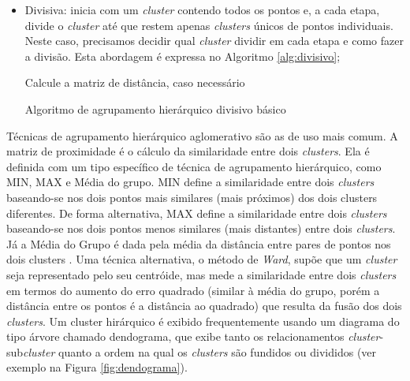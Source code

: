 \begin{itemize}
\begin{itemize}
        \item Divisiva: inicia com um \textit{cluster} contendo todos os pontos e, a cada etapa, divide o \textit{cluster} até que restem apenas \textit{clusters} únicos de pontos individuais. Neste caso, precisamos decidir qual \textit{cluster} dividir em cada etapa e como fazer a divisão. Esta abordagem é expressa no Algoritmo \ref{alg:divisivo};
        
        \begin{algorithm}[!htb]
            \SetAlgoLined
            Calcule a matriz de distância, caso necessário\;
        \caption{Algoritmo de agrupamento hierárquico divisivo básico}
        \label{alg:divisivo}
        \end{algorithm}
        
    \end{itemize}
    
    Técnicas de agrupamento hierárquico aglomerativo são as de uso mais comum. A matriz de proximidade é o cálculo da similaridade entre dois \textit{clusters}. Ela é definida com um tipo específico de técnica de agrupamento hierárquico, como MIN, MAX e Média do grupo. MIN define a similaridade entre dois \textit{clusters} baseando-se nos dois pontos mais similares (mais próximos) dos dois clusters diferentes. De forma alternativa, MAX define a similaridade entre dois \textit{clusters} baseando-se nos dois pontos menos similares (mais distantes) entre dois \textit{clusters}. %
    Já a Média do Grupo é dada pela média da distância entre pares de pontos nos dois clusters \cite{pang2009}. Uma técnica alternativa, o método de \textit{Ward}, supõe que um \textit{cluster} seja representado pelo seu centróide, mas mede a similaridade entre dois \textit{clusters} em termos do aumento do erro quadrado (similar à média do grupo, porém a distância entre os pontos é a distância ao quadrado) que resulta da fusão dos dois \textit{clusters}. Um cluster hirárquico é exibido frequentemente usando um diagrama do tipo árvore chamado dendograma, que exibe tanto os relacionamentos \textit{cluster}-sub\textit{cluster} quanto a ordem na qual os \textit{clusters} são fundidos ou divididos \cite{pang2009} (ver exemplo na Figura \ref{fig:dendograma}).
    

\end{itemize}
